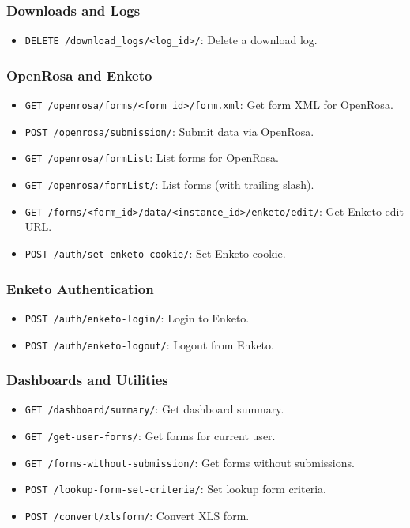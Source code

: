\documentclass[11pt]{article}
\begin{document}
\subsubsection{Downloads and Logs}
\begin{itemize}[leftmargin=*]
  \item \verb|DELETE /download_logs/<log_id>/|: Delete a download log.
\end{itemize}

\subsubsection{OpenRosa and Enketo}
\begin{itemize}[leftmargin=*]
  \item \verb|GET /openrosa/forms/<form_id>/form.xml|: Get form XML for OpenRosa.
  \item \verb|POST /openrosa/submission/|: Submit data via OpenRosa.
  \item \verb|GET /openrosa/formList|: List forms for OpenRosa.
  \item \verb|GET /openrosa/formList/|: List forms (with trailing slash).
  \item \verb|GET /forms/<form_id>/data/<instance_id>/enketo/edit/|: Get Enketo edit URL.
  \item \verb|POST /auth/set-enketo-cookie/|: Set Enketo cookie.
\end{itemize}

\subsubsection{Enketo Authentication}
\begin{itemize}[leftmargin=*]
  \item \verb|POST /auth/enketo-login/|: Login to Enketo.
  \item \verb|POST /auth/enketo-logout/|: Logout from Enketo.
\end{itemize}

\subsubsection{Dashboards and Utilities}
\begin{itemize}[leftmargin=*]
  \item \verb|GET /dashboard/summary/|: Get dashboard summary.
  \item \verb|GET /get-user-forms/|: Get forms for current user.
  \item \verb|GET /forms-without-submission/|: Get forms without submissions.
  \item \verb|POST /lookup-form-set-criteria/|: Set lookup form criteria.
  \item \verb|POST /convert/xlsform/|: Convert XLS form.
\end{itemize}
\end{document}
